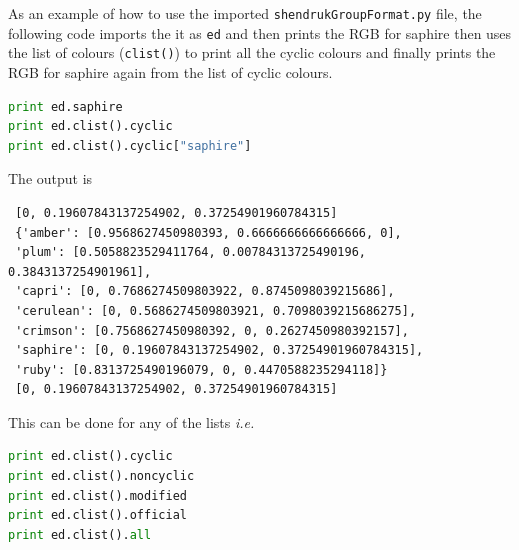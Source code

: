 \documentclass[10pt,a4paper]{article}
\begin{document}
As an example of how to use the imported \texttt{shendrukGroupFormat.py} file, the following code imports the it as \texttt{ed} and then prints the RGB for saphire then uses the list of colours (\texttt{clist()}) to print all the cyclic colours and finally prints the RGB for saphire again from the list of cyclic colours. 
\begin{lstlisting}[language=Python]
print ed.saphire
print ed.clist().cyclic
print ed.clist().cyclic["saphire"]
\end{lstlisting}
The output is
\begin{verbatim}
 [0, 0.19607843137254902, 0.37254901960784315]
 {'amber': [0.9568627450980393, 0.6666666666666666, 0], 
 'plum': [0.5058823529411764, 0.00784313725490196, 0.3843137254901961], 
 'capri': [0, 0.7686274509803922, 0.8745098039215686], 
 'cerulean': [0, 0.5686274509803921, 0.7098039215686275], 
 'crimson': [0.7568627450980392, 0, 0.2627450980392157], 
 'saphire': [0, 0.19607843137254902, 0.37254901960784315], 
 'ruby': [0.8313725490196079, 0, 0.4470588235294118]}
 [0, 0.19607843137254902, 0.37254901960784315]
\end{verbatim}
This can be done for any of the lists \textit{i.e.}
\begin{lstlisting}[language=Python]
print ed.clist().cyclic
print ed.clist().noncyclic
print ed.clist().modified
print ed.clist().official
print ed.clist().all
\end{lstlisting}
\end{document}

